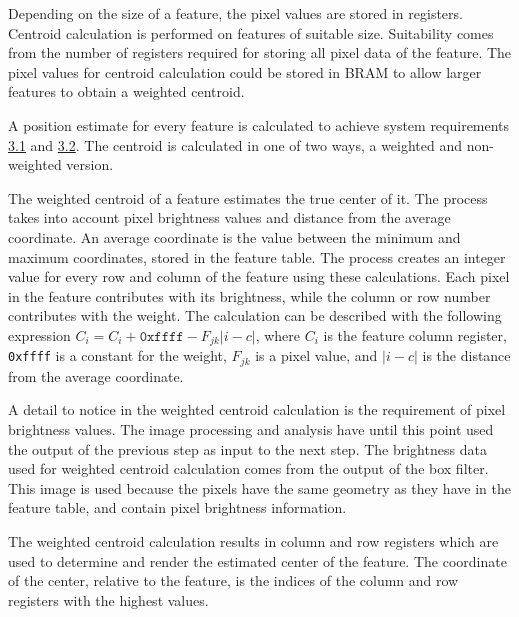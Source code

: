\documentclass[12pt]{report}
\begin{document}
\par
Depending on the size of a feature, the pixel values are stored in registers. Centroid calculation is performed on features of suitable size. Suitability comes from the number of registers required for storing all pixel data of the feature. The pixel values for centroid calculation could be stored in BRAM to allow larger features to obtain a weighted centroid. \citep{stpp}
\par
A position estimate for every feature is calculated to achieve system requirements \hyperref[req3.1]{3.1} and \hyperref[req3.2]{3.2}. The centroid is calculated in one of two ways, a weighted and non-weighted version.
\par 
The weighted centroid of a feature estimates the true center of it. The process takes into account pixel brightness values and distance from the average coordinate. An average coordinate is the value between the minimum and maximum coordinates, stored in the feature table. The process creates an integer value for every row and column of the feature using these calculations. Each pixel in the feature contributes with its brightness, while the column or row number contributes with the weight. The calculation can be described with the following expression $C_{i} = C_{i} + \texttt{0xffff} - F_{jk}|i-c|$, where $C_{i}$ is the feature column register, \texttt{0xffff} is a constant for the weight, $F_{jk}$ is a pixel value, and $|i-c|$ is the distance from the average coordinate. \citep{stpp}
\par
A detail to notice in the weighted centroid calculation is the requirement of pixel brightness values. The image processing and analysis have until this point used the output of the previous step as input to the next step. The brightness data used for weighted centroid calculation comes from the output of the box filter. This image is used because the pixels have the same geometry as they have in the feature table, and contain pixel brightness information. \citep{stpp}
\par
The weighted centroid calculation results in column and row registers which are used to determine and render the estimated center of the feature. The coordinate of the center, relative to the feature, is the indices of the column and row registers with the highest values. \citep{stpp}
\par
\end{document}
